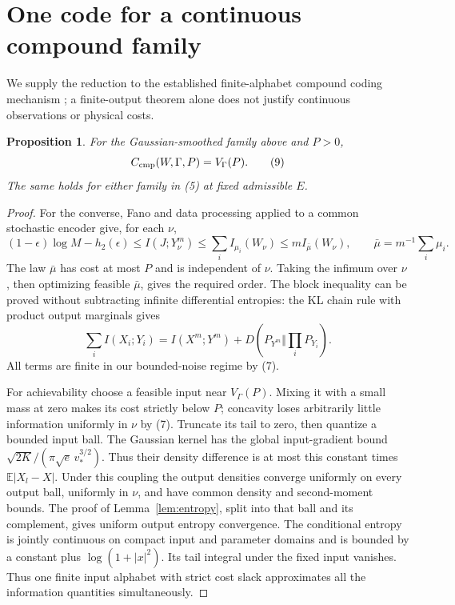 \documentclass[11pt]{article}
\newtheorem{proposition}[theorem]{Proposition}
\newcommand{\E}{\mathbb E}
\begin{document}
\section{One code for a continuous compound family}

We supply the reduction to the established finite-alphabet compound
coding mechanism \cite{types,compound}; a finite-output theorem alone
does not justify continuous observations or physical costs.

\begin{proposition}\label{prop:compound}
For the Gaussian-smoothed family above and \(P>0\),
\[
 C_{\rm cmp}(W,\Gamma,P)=V_\Gamma(P).                        \tag{9}
\]
The same holds for either family in (5) at fixed admissible \(E\).
\end{proposition}
\begin{proof}
For the converse, Fano and data processing applied to a common stochastic
encoder give, for each \(\nu\),
\[
 (1-\epsilon)\log M-h_2(\epsilon)
 \leq I(J;Y_\nu^m)\leq\sum_i I_{\mu_i}(W_\nu)
 \leq mI_{\bar\mu}(W_\nu),\qquad
 \bar\mu=m^{-1}\sum_i\mu_i .
\]
The law \(\bar\mu\) has cost at most \(P\) and is independent of \(\nu\).
Taking the infimum over \(\nu\), then optimizing feasible \(\bar\mu\),
gives the required order. The block inequality can be proved without
subtracting infinite differential entropies: the KL chain rule with
product output marginals gives
\[
 \sum_i I(X_i;Y_i)=I(X^m;Y^m)
             +D(P_{Y^m}\Vert\textstyle\prod_i P_{Y_i}).
\]
All terms are finite in our bounded-noise regime by (7).

For achievability choose a feasible input near \(V_\Gamma(P)\).
Mixing it with a small mass at zero makes its cost strictly below \(P\);
concavity loses arbitrarily little information uniformly in \(\nu\)
by (7). Truncate its tail to zero, then quantize a bounded input ball.
The Gaussian kernel has the global input-gradient bound
\(\sqrt{2K}/(\pi\sqrt e\,v_*^{3/2})\).
Thus their density difference is at most this constant times
\(\E|X_l-X|\). Under this coupling the output densities converge uniformly
on every output ball, uniformly in \(\nu\), and have common density and
second-moment bounds. The proof of Lemma~\ref{lem:entropy}, split into
that ball and its complement, gives uniform output entropy convergence.
The conditional entropy is jointly continuous on compact input and
parameter domains and is bounded by a constant plus
\(\log(1+|x|^2)\). Its tail integral under the fixed input vanishes.
Thus one finite input alphabet with strict cost slack approximates all
the information quantities simultaneously.


\end{proof}
\end{document}
